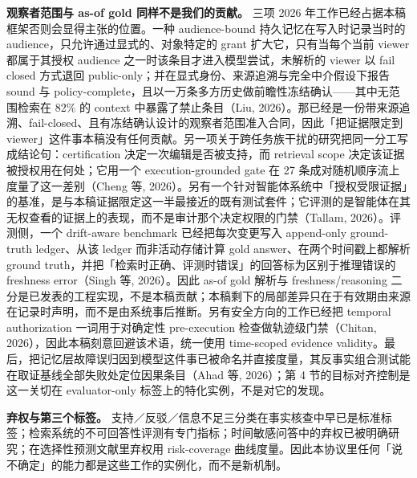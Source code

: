 \documentclass[UTF8,11pt]{ctexart}
\begin{document}
\noindent\textbf{观察者范围与 as-of gold 同样不是我们的贡献。} 三项 2026 年工作已经占据本稿框架否则会显得主张的位置。一种 audience-bound 持久记忆在写入时记录当时的 audience，只允许通过显式的、对象特定的 grant 扩大它，只有当每个当前 viewer 都属于其授权 audience 之一时该条目才进入模型尝试，未解析的 viewer 以 fail closed 方式退回 public-only；并在显式身份、来源追溯与完全中介假设下报告 sound 与 policy-complete，且以一万条多方历史做前瞻性冻结确认——其中无范围检索在 82\% 的 context 中暴露了禁止条目（Liu, 2026）。那已经是一份带来源追溯、fail-closed、且有冻结确认设计的观察者范围准入合同，因此「把证据限定到 viewer」这件事本稿没有任何贡献。另一项关于跨任务族干扰的研究把同一分工写成结论句：certification 决定一次编辑是否被支持，而 retrieval scope 决定该证据被授权用在何处；它用一个 execution-grounded gate 在 27 条成对随机顺序流上度量了这一差别（Cheng 等, 2026）。另有一个针对智能体系统中「授权受限证据」的基准，是与本稿证据限定这一半最接近的既有测试套件；它评测的是智能体在其无权查看的证据上的表现，而不是审计那个决定权限的门禁（Tallam, 2026）。评测侧，一个 drift-aware benchmark 已经把每次变更写入 append-only ground-truth ledger、从该 ledger 而非活动存储计算 gold answer、在两个时间戳上都解析 ground truth，并把「检索时正确、评测时错误」的回答标为区别于推理错误的 freshness error（Singh 等, 2026）。因此 as-of gold 解析与 freshness/reasoning 二分是已发表的工程实现，不是本稿贡献；本稿剩下的局部差异只在于有效期由来源在记录时声明，而不是由系统事后推断。另有安全方向的工作已经把 temporal authorization 一词用于对确定性 pre-execution 检查做轨迹级门禁（Chitan, 2026），因此本稿刻意回避该术语，统一使用 time-scoped evidence validity。最后，把记忆层故障误归因到模型这件事已被命名并直接度量，其反事实组合测试能在取证基线全部失败处定位因果条目（Ahad 等, 2026）；第 4 节的目标对齐控制是这一关切在 evaluator-only 标签上的特化实例，不是对它的发现。

\noindent\textbf{弃权与第三个标签。} 支持／反驳／信息不足三分类在事实核查中早已是标准标签；检索系统的不可回答性评测有专门指标；时间敏感问答中的弃权已被明确研究；在选择性预测文献里弃权用 risk-coverage 曲线度量。因此本协议里任何「说不确定」的能力都是这些工作的实例化，而不是新机制。
\end{document}
